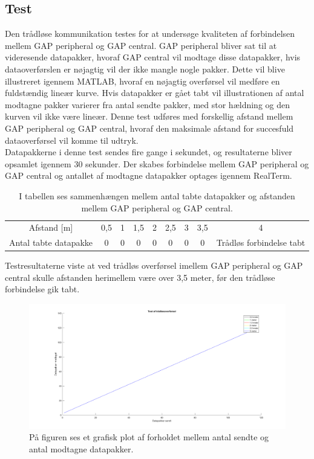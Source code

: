 \subsection{Test}
Den trådløse kommunikation testes for at undersøge kvaliteten af forbindelsen mellem GAP peripheral og GAP central. GAP peripheral bliver sat til at videresende datapakker, hvoraf GAP central  vil modtage disse datapakker, hvis dataoverførslen er nøjagtig vil der ikke mangle nogle pakker. Dette vil blive illustreret igennem MATLAB, hvoraf en nøjagtig overførsel vil medføre en fuldstændig lineær kurve. Hvis datapakker er gået tabt vil illustrationen af antal modtagne pakker varierer fra antal sendte pakker, med stor hældning og den kurven vil ikke være lineær. Denne test udføres med forskellig afstand mellem GAP peripheral og GAP central, hvoraf den maksimale afstand for succesfuld dataoverførsel vil komme til udtryk. \\
Datapakkerne i denne test sendes fire gange i sekundet, og resultaterne bliver opsamlet igennem 30 sekunder. Der skabes forbindelse mellem GAP peripheral og GAP central og antallet af modtagne datapakker optages igennem RealTerm.
\begin{table}[H]
	\centering
	\begin{tabular}{ccccccccc}
		\rowcolor[HTML]{C0C0C0} 
		Afstand {[}m{]} & 0,5 & 1 & 1,5 & 2 & 2,5 & 3 & 3,5 & 4  \\
		Antal tabte datapakke & 0 & 0 & 0 & 0 & 0 & 0 & 0 & Trådløs forbindelse tabt 
	\end{tabular}
	\caption{I tabellen ses sammenhængen mellem antal tabte datapakker og afstanden mellem GAP peripheral og GAP central.}
	\label{test:ble_overforsel}
\end{table} \vspace{-.5cm}
Testresultaterne viste at ved trådløs overførsel imellem GAP peripheral og GAP central skulle afstanden herimellem være over 3,5 meter, før den trådløse forbindelse gik tabt.
\begin{figure}[H]
	\centering
	\includegraphics[scale=0.3]{figures/cDesign/test_ble.png}
	\caption{På figuren ses et grafisk plot af forholdet mellem antal sendte og antal modtagne datapakker. }
	\label{fig:test_ble}
\end{figure}
